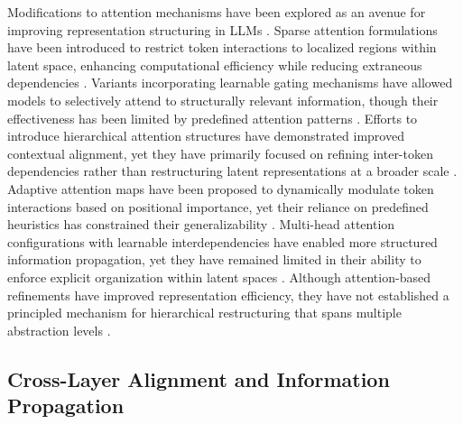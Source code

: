 Modifications to attention mechanisms have been explored as an avenue for improving representation structuring in LLMs \cite{nijodo2024automated}. Sparse attention formulations have been introduced to restrict token interactions to localized regions within latent space, enhancing computational efficiency while reducing extraneous dependencies \cite{ga2024evaluating}. Variants incorporating learnable gating mechanisms have allowed models to selectively attend to structurally relevant information, though their effectiveness has been limited by predefined attention patterns \cite{ blackwood2024implementation}. Efforts to introduce hierarchical attention structures have demonstrated improved contextual alignment, yet they have primarily focused on refining inter-token dependencies rather than restructuring latent representations at a broader scale \cite{arsal2024emerging, embury2024dynamic}. Adaptive attention maps have been proposed to dynamically modulate token interactions based on positional importance, yet their reliance on predefined heuristics has constrained their generalizability \cite{nishikado2024mitigating}. Multi-head attention configurations with learnable interdependencies have enabled more structured information propagation, yet they have remained limited in their ability to enforce explicit organization within latent spaces \cite{anderson2024semantic}. Although attention-based refinements have improved representation efficiency, they have not established a principled mechanism for hierarchical restructuring that spans multiple abstraction levels \cite{vitiello2024context}.

\subsection{Cross-Layer Alignment and Information Propagation}


